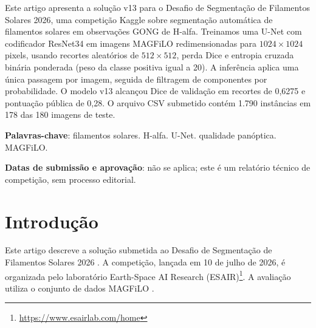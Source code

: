 \documentclass[
  article,
  11pt,
  oneside,
  a4paper,
  english,
  brazil,
  sumario=tradicional
]{abntex2}
\begin{document}
\frenchspacing
\maketitle

\begin{resumoumacoluna}
Este artigo apresenta a solução v13 para o Desafio de Segmentação de Filamentos Solares 2026, uma competição Kaggle sobre segmentação automática de filamentos solares em observações GONG de H-alfa. Treinamos uma U-Net com codificador ResNet34 em imagens MAGFiLO redimensionadas para $1024\times1024$ pixels, usando recortes aleatórios de $512\times512$, perda Dice e entropia cruzada binária ponderada (peso da classe positiva igual a 20). A inferência aplica uma única passagem por imagem, seguida de filtragem de componentes por probabilidade. O modelo v13 alcançou Dice de validação em recortes de 0,6275 e pontuação pública de 0,28. O arquivo CSV submetido contém 1.790 instâncias em 178 das 180 imagens de teste.

\vspace{\onelineskip}
\noindent
\textbf{Palavras-chave}: filamentos solares. H-alfa. U-Net. qualidade panóptica. MAGFiLO.
\end{resumoumacoluna}

\begin{center}\smaller
\textbf{Datas de submissão e aprovação}: não se aplica; este é um relatório técnico de competição, sem processo editorial.
\end{center}

\textual

\section{Introdução}

Este artigo descreve a solução submetida ao Desafio de Segmentação de Filamentos Solares 2026 \cite{filament-segmentation-2026}. A competição, lançada em 10 de julho de 2026, é organizada pelo laboratório Earth-Space AI Research (ESAIR)\footnote{\url{https://www.esairlab.com/home}}. A avaliação utiliza o conjunto de dados MAGFiLO \cite{ahmadzadeh2024dataset}.
\end{document}

